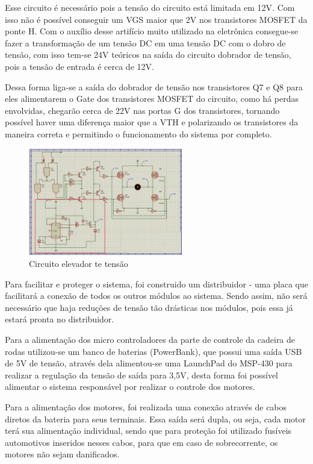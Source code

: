 Esse circuito é necessário pois a tensão do circuito está limitada em 12V. Com isso não é possível conseguir um VGS maior que 2V nos transistores MOSFET da ponte H. Com o auxílio desse artifício muito utilizado na eletrônica consegue-se fazer a transformação de um tensão DC em uma tensão DC com o dobro de tensão, com isso tem-se 24V teóricos na saída do circuito dobrador de tensão, pois a tensão de entrada é cerca de 12V.

Dessa forma liga-se a saída do dobrador de tensão nos transistores Q7 e Q8 para eles alimentarem o Gate dos transistores MOSFET do circuito, como há perdas envolvidas, chegarão cerca de 22V nas portas G dos transistores, tornando possível haver uma diferença maior que a VTH e polarizando os transistores da maneira correta e permitindo o funcionamento do sistema por completo.

\begin{figure}[!htb]
	\centering
	\includegraphics[width=0.6\textwidth]{figuras/referencialteorico/figurax_4}
	\caption{Circuito elevador te tensão}
	\label{fig:figx+4}
\end{figure}


Para facilitar e proteger o sistema, foi construido um distribuidor -  uma placa que facilitará a conexão de todos os outros módulos ao sistema. Sendo assim, não será necessário que haja reduções de tensão tão drásticas nos módulos, pois essa já estará pronta no distribuidor.

Para a alimentação dos micro controladores da parte de controle da cadeira de rodas utilizou-se um banco de baterias (PowerBank), que possui uma saída USB de 5V de tensão, através dela alimentou-se uma LaunchPad do MSP-430 para realizar a regulação da tensão de saída para 3,5V, desta forma foi possível alimentar o sistema responsável por realizar o controle dos motores.

Para a alimentação dos motores, foi realizada uma conexão através de cabos diretos da bateria para seus terminais. Essa saída será dupla, ou seja, cada motor terá sua alimentação individual, sendo que para proteção foi utilizado fusíveis automotivos inseridos nesses cabos, para que em caso de sobrecorrente, os motores não sejam danificados.

